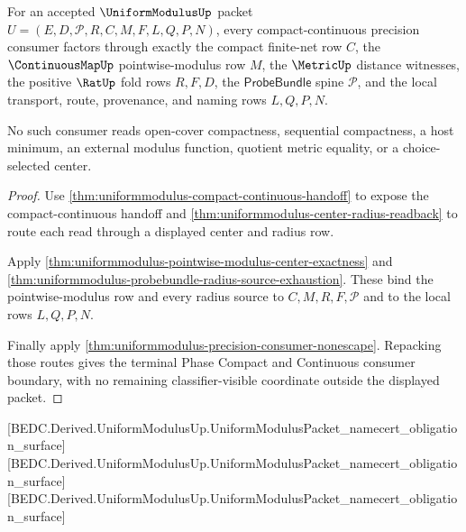 \begin{theorem}
\label{thm:uniformmodulus-terminal-compact-continuous-route}
For an accepted $\UniformModulusUp$ packet $U=(E,D,\mathcal{P},R,C,M,F,L,Q,P,N)$, every compact-continuous precision consumer factors through exactly the compact finite-net row $C$, the $\ContinuousMapUp$ pointwise-modulus row $M$, the $\MetricUp$ distance witnesses, the positive $\RatUp$ fold rows $R,F,D$, the $\mathsf{ProbeBundle}$ spine $\mathcal{P}$, and the local transport, route, provenance, and naming rows $L,Q,P,N$.

No such consumer reads open-cover compactness, sequential compactness, a host minimum, an external modulus function, quotient metric equality, or a choice-selected center.
\end{theorem}
\begin{proof}
Use \autoref{thm:uniformmodulus-compact-continuous-handoff} to expose the compact-continuous handoff and \autoref{thm:uniformmodulus-center-radius-readback} to route each read through a displayed center and radius row.

Apply \autoref{thm:uniformmodulus-pointwise-modulus-center-exactness} and \autoref{thm:uniformmodulus-probebundle-radius-source-exhaustion}. These bind the pointwise-modulus row and every radius source to $C,M,R,F,\mathcal{P}$ and to the local rows $L,Q,P,N$.

Finally apply \autoref{thm:uniformmodulus-precision-consumer-nonescape}. Repacking those routes gives the terminal Phase Compact and Continuous consumer boundary, with no remaining classifier-visible coordinate outside the displayed packet.
\end{proof}




[BEDC.Derived.UniformModulusUp.UniformModulusPacket\_namecert\_obligation\_surface]
[BEDC.Derived.UniformModulusUp.UniformModulusPacket\_namecert\_obligation\_surface]
[BEDC.Derived.UniformModulusUp.UniformModulusPacket\_namecert\_obligation\_surface]

